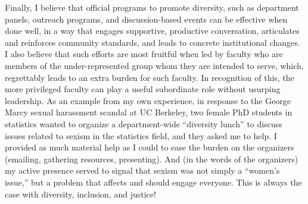 Finally, I believe that official programs to promote diversity, such as
department panels, outreach programs, and discussion-based events can be
effective when done well, in a way that engages supportive, productive
conversation, articulates and reinforces community standards, and leads to
concrete institutional changes.  I also believe that such efforts are most
fruitful when led by faculty who are members of the under-represented group whom
they are intended to serve, which, regrettably leads to an extra burden for such
faculty. In recognition of this, the more privileged faculty can play a useful
subordinate role without usurping leadership.  As an example from my own
experience, in response to the George Marcy sexual harassment scandal at UC
Berkeley, two female PhD students in statistics wanted to organize a
department-wide ``diversity lunch'' to discuss issues related to sexism in the
statistics field, and they asked me to help. I provided as much material help as
I could to ease the burden on the organizers (emailing, gathering resources,
presenting). And (in the words of the organizers) my active presence served to
signal that sexism was not simply a ``women's issue,'' but a problem that
affects and should engage everyone.  This is always the case with diversity,
inclusion, and justice!



